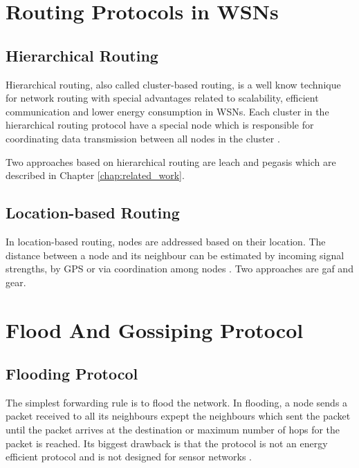 \documentclass[USenglish]{uit-thesis}
\begin{document}

\section{Routing Protocols in WSNs}
\subsection{Hierarchical Routing}
Hierarchical routing, also called cluster-based routing, is a well know technique for network routing with special advantages related to scalability, efficient communication and lower energy consumption in WSNs. Each cluster in the hierarchical routing protocol have a special node which is responsible for coordinating data transmission between all nodes in the cluster \cite{leach, leach_perf, routing_survey}.


Two approaches based on hierarchical routing are \gls{leach}\cite{leach} and \gls{pegasis}\cite{pegasis} which are described in Chapter \ref{chap:related_work}.


\subsection{Location-based Routing}
In location-based routing, nodes are addressed based on their location. The distance between a node and its neighbour can be estimated by incoming signal strengths, by GPS or via coordination among nodes \cite{routing_survey}. Two approaches are \gls{gaf}\cite{gaf} and \gls{gear}\cite{gear}.


\section{Flood And Gossiping Protocol}
\subsection{Flooding Protocol}
The simplest forwarding rule is to flood the network. In flooding, a node sends a packet received to all its neighbours expept the neighbours which sent the packet until the packet arrives at the destination or maximum number of hops for the packet is reached. Its biggest drawback is that the protocol is not an energy efficient protocol and is not designed for sensor networks \cite{wsnbook}.
\end{document}

